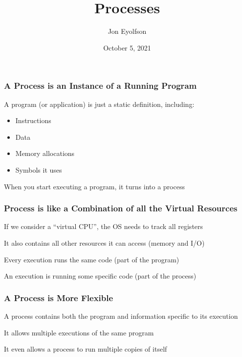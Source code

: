 

\title{Processes}
\author{Jon Eyolfson}
\date{October 5, 2021}


  \begin{frame}
    \titlepage
  \end{frame}

  \begin{frame}
    \frametitle{A Process is an Instance of a Running Program}

    A program (or application) is just a static definition, including:

    \begin{itemize}
      \item Instructions
      \item Data
      \item Memory allocations
      \item Symbols it uses
    \end{itemize}

    \vspace{2em}

    When you start executing a program, it turns into a process
  \end{frame}

  \begin{frame}
    \frametitle{Process is like a Combination of all the Virtual Resources}

    If we consider a ``virtual CPU'', the OS needs to track all registers

    \vspace{2em}

    It also contains all other resources it can access (memory and I/O)

    \vspace{4em}

    Every execution runs the same code (part of the program)

    \hspace{2em} An execution is running some specific code (part of the
                 process)
  \end{frame}

  \begin{frame}
    \frametitle{A Process is More Flexible}

    A process contains both the program and information specific
    to its execution

    \vspace{4em}

    It allows multiple executions of the same program

    \vspace{2em}

    It even allows a process to run multiple copies of itself
  \end{frame}

